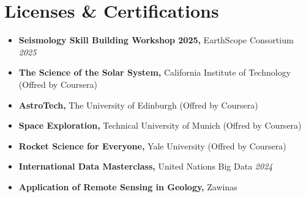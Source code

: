 \documentclass[letterpaper,11pt]{article}
\begin{document}
	\section{Licenses \& Certifications}
						\vspace{-0.7em}
	\begin{itemize}[left=0pt, label={}, topsep=7.5pt, partopsep=0pt, itemsep=6pt, parsep=0pt]
	\item \textbf{Seismology Skill Building Workshop 2025,} EarthScope Consortium \hfill \textit{2025}
\end{itemize}
\vspace{-1.2em}
	\begin{itemize}[left=0pt, label={}, topsep=7.5pt, partopsep=0pt, itemsep=6pt, parsep=0pt]
	\item \textbf{The Science of the Solar System,} California Institute of Technology (Offred by Coursera)
\end{itemize}
\vspace{-1.2em}
\begin{itemize}[left=0pt, label={}, topsep=7.5pt, partopsep=0pt, itemsep=6pt, parsep=0pt]
	\item \textbf{AstroTech,} The University of Edinburgh (Offred by Coursera)
\end{itemize}
\vspace{-1.2em}
\begin{itemize}[left=0pt, label={}, topsep=7.5pt, partopsep=0pt, itemsep=6pt, parsep=0pt]
	\item \textbf{Space Exploration,} Technical University of Munich (Offred by Coursera)
\end{itemize}
\vspace{-1.2em}
\begin{itemize}[left=0pt, label={}, topsep=7.5pt, partopsep=0pt, itemsep=6pt, parsep=0pt]
	\item \textbf{Rocket Science for Everyone,} Yale University (Offred by Coursera)
\end{itemize}
\vspace{-1.2em}
	\begin{itemize}[left=0pt, label={}, topsep=7.5pt, partopsep=0pt, itemsep=6pt, parsep=0pt]
		\item \textbf{International Data Masterclass,} United Nations Big Data  \hfill \textit{2024}
	\end{itemize}
	\vspace{-1.2em} 
	\begin{itemize}[left=0pt, label={}, topsep=7.5pt, partopsep=0pt, itemsep=6pt, parsep=0pt]
		\item \textbf{Application of Remote Sensing in Geology,} Zawinas
	\end{itemize}
\end{document}

